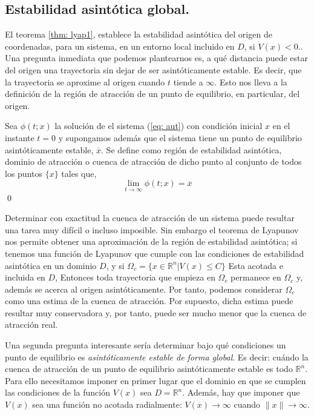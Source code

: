 \subsection{Estabilidad asintótica global.}
El teorema \ref{thm: lyap1}, establece la estabilidad asintótica del origen de coordenadas, para un sistema, en un entorno local incluido en $D$, si $\dot V(x) < 0.$.  Una pregunta inmediata que podemos plantearnos es, a qué distancia puede estar del origen una trayectoria sin dejar de ser asintóticamente estable. Es decir, que la trayectoria se aproxime al origen cuando $t$ tiende a $\infty$. Esto nos lleva a la definición de la región de atracción de un punto de equilibrio, en particular, del origen.
\begin{definition}
Sea $\phi(t;x)$ la solución de el sistema (\ref{eq: aut}) con condición inicial $x$ en el instante $t=0$ y supongamos además que el sistema tiene un punto de equilibrio asintóticamente estable, $\overline x$. Se define como región de estabilidad asintótica, dominio de atracción o cuenca de atracción de dicho punto al conjunto de todos los puntos $\{x\}$ tales que,
\begin{equation}
\lim_{t \to \infty} \phi(t;x) = \overline x
\end{equation}
\qed
\end{definition}

Determinar con exactitud la cuenca de atracción de un sistema puede resultar una tarea muy difícil o incluso imposible. Sin embargo el teorema de Lyapunov nos permite obtener una aproximación de la región de estabilidad asintótica; si tenemos una función de Lyapunov que cumple con las condiciones de estabilidad asintótica en un dominio $D$, y si $\Omega_c =\{x \in \mathbb{R}^n \vert V(x) \leq C\}$ Esta acotada e incluida en $D$,  Entonces toda trayectoria que empieza en $\Omega_c$ permanece en $\Omega_c$ y, además se acerca al origen asintóticamente. Por tanto, podemos considerar $\Omega_c$ como una estima de la cuenca de atracción. Por supuesto, dicha estima puede resultar muy conservadora y, por  tanto, puede ser mucho menor que la cuenca de atracción real.

Una segunda pregunta interesante sería determinar bajo qué condiciones un punto de equilibrio es \emph{asintóticamente estable de forma global}. Es decir: cuándo la cuenca de atracción de un punto de equilibrio asintóticamente estable es todo $\mathbb{R}^n$.  Para ello necesitamos imponer en primer lugar que el dominio en que se cumplen las condiciones de la función $V(x)$ sea $D=\mathbb{R}^n$. Además, hay que imponer que   $V(x)$ sea una función no acotada radialmente: $V(x) \to \infty$ cuando $\|x\| \to \infty$.

